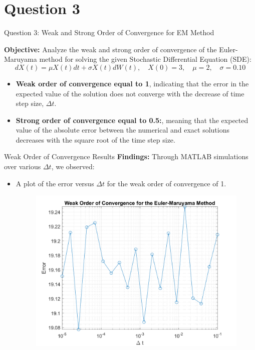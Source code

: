 \documentclass[compress,12pt]{beamer}
\begin{document}
\section{Question 3}
\begin{frame}{Question 3: Weak and Strong Order of Convergence for EM Method}

    \textbf{Objective:} Analyze the weak and strong order of convergence of the Euler-Maruyama method for solving the given Stochastic Differential Equation (SDE):
    \[
    dX(t) = \mu X(t) dt + \sigma X(t) dW(t), \quad X(0)=3, \quad \mu=2 , \quad \sigma=0.10
    \]

    \begin{itemize}
        \item \textbf{Weak order of convergence equal to 1}, indicating that the error in the expected value of the solution does not converge with the decrease of time step size, \(\Delta t\).
        \item \textbf{Strong order of convergence equal to 0.5:}, meaning that the expected value of the absolute error between the numerical and exact solutions decreases with the square root of the time step size.
    \end{itemize}
\end{frame}

\begin{frame}{Weak Order of Convergence Results}
    \textbf{Findings:} Through MATLAB simulations over various \(\Delta t\), we observed:
    
    \begin{itemize}
        \item A plot of the error versus \(\Delta t\) for the  weak order of convergence of 1. 
        \begin{figure}[H]
            \centering
            \includegraphics[scale=0.25]{project4Q3fig1.png}
            \label{fig:3a}
       \end{figure}
        
    \end{itemize}
\end{frame}
\end{document}
